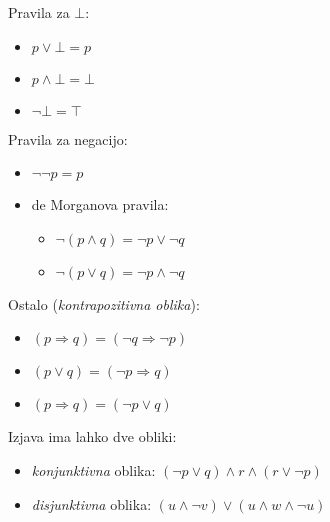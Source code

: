 Pravila za $\bot$:
\begin{itemize}
	\item $p \lor \bot = p$
	\item $p \land \bot = \bot$
	\item $\lnot \bot = \top$
\end{itemize}

Pravila za negacijo:
\begin{itemize}
	\item $\lnot \lnot p = p$
	\item de Morganova pravila:
	\begin{itemize}
		\item $\lnot (p \land q) = \lnot p \lor \lnot q$
		\item $\lnot (p \lor q) = \lnot p \land \lnot q$
	\end{itemize}
\end{itemize}

Ostalo (\emph{kontrapozitivna oblika}):
\begin{itemize}
	\item $(p \Rightarrow q) = (\lnot q \Rightarrow \lnot p)$
	\item $(p \lor q) = (\lnot p \Rightarrow q)$
	\item $(p \Rightarrow q) = (\lnot p \lor q)$
\end{itemize}

Izjava ima lahko dve obliki:
\begin{itemize}
	\item \emph{konjunktivna} oblika: $(\lnot p \lor q) \land r \land (r \lor \lnot p)$
	\item \emph{disjunktivna} oblika: $(u \land \lnot v) \lor (u \land w \land \lnot u)$
\end{itemize}

